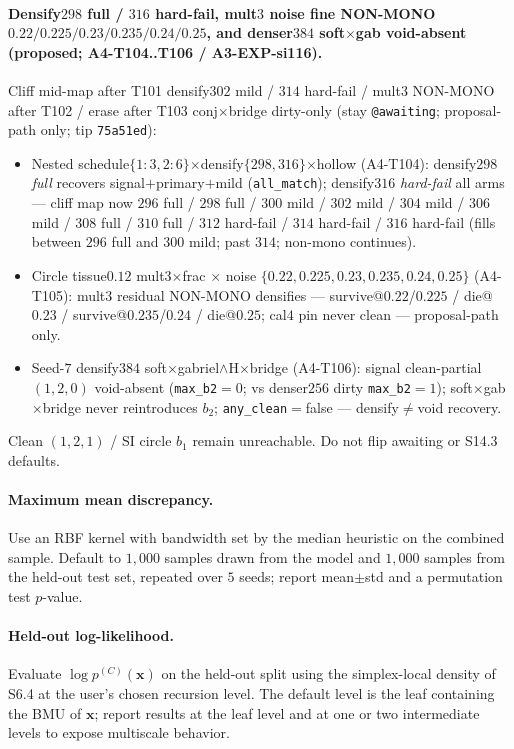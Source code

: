 \documentclass[11pt]{article}
\begin{document}
\paragraph{Densify$298$ full / $316$ hard-fail, mult$3$ noise fine
NON-MONO $0.22/0.225/0.23/0.235/0.24/0.25$, and denser$384$ soft$\times$gab
void-absent (proposed; A4-T104..T106 / A3-EXP-si116).}
Cliff mid-map after T101 densify$302$ mild / $314$ hard-fail / mult$3$
NON-MONO after T102 / erase after T103 conj$\times$bridge dirty-only
(stay \texttt{@awaiting}; proposal-path only; tip \texttt{75a51ed}):
\begin{itemize}[leftmargin=1.5em]
  \item Nested schedule$\{1{:}3,2{:}6\}$$\times$densify$\{298,316\}$$\times$hollow
  (A4-T104): densify$298$ \emph{full} recovers signal$+$primary$+$mild
  (\texttt{all\_match}); densify$316$ \emph{hard-fail} all arms --- cliff
  map now $296$ full / $298$ full / $300$ mild / $302$ mild / $304$ mild /
  $306$ mild / $308$ full / $310$ full / $312$ hard-fail / $314$
  hard-fail / $316$ hard-fail (fills between $296$ full and $300$ mild;
  past $314$; non-mono continues).
  \item Circle tissue$0.12$ mult$3$$\times$frac $\times$ noise
  $\{0.22,0.225,0.23,0.235,0.24,0.25\}$ (A4-T105): mult$3$ residual
  NON-MONO densifies --- survive@$0.22$/$0.225$ / die@$0.23$ /
  survive@$0.235$/$0.24$ / die@$0.25$; cal$4$ pin never clean ---
  proposal-path only.
  \item Seed-$7$ densify$384$ soft$\times$gabriel$\wedge$H$\times$bridge
  (A4-T106): signal clean-partial $(1,2,0)$ void-absent
  (\texttt{max\_b2}${=}0$; vs denser$256$ dirty \texttt{max\_b2}${=}1$);
  soft$\times$gab$\times$bridge never reintroduces $b_2$;
  \texttt{any\_clean}${=}$false --- densify$\neq$void recovery.
\end{itemize}
Clean $(1,2,1)$ / SI circle $b_1$ remain unreachable. Do not flip
awaiting or S14.3 defaults.

\paragraph{Maximum mean discrepancy.}
Use an RBF kernel with bandwidth set by the median heuristic on the combined sample. Default to $1{,}000$ samples drawn from the model and $1{,}000$ samples from the held-out test set, repeated over $5$ seeds; report mean$\pm$std and a permutation test $p$-value.

\paragraph{Held-out log-likelihood.}
Evaluate $\log p^{(C)}(\mathbf x)$ on the held-out split using the simplex-local density of S6.4 at the user's chosen recursion level. The default level is the leaf containing the BMU of $\mathbf x$; report results at the leaf level and at one or two intermediate levels to expose multiscale behavior.
\end{document}
